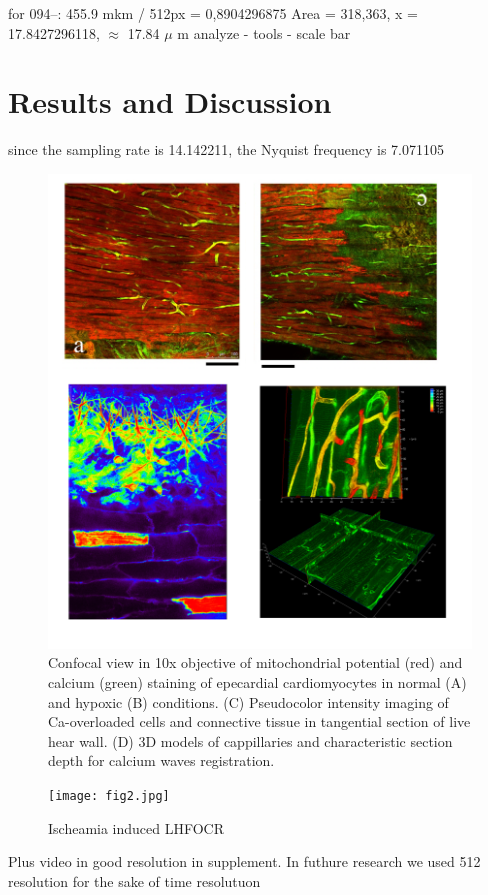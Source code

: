 \documentclass{biophys-new}
\begin{document}
for 094--: 455.9 mkm / 512px = 0,8904296875
Area = 318,363, x = 17.8427296118, $\approx$ 17.84 $\mu$ m
analyze - tools - scale bar


\section*{Results and Discussion}

since the sampling rate is 14.142211, the Nyquist frequency is 7.071105



\begin{figure}[hbt!]
\centering
\includegraphics[width=0.8\linewidth]{fig1.png}
\caption{Confocal view in 10x objective of mitochondrial potential (red) and calcium (green) staining of epecardial cardiomyocytes in normal (A) and hypoxic (B) conditions. (C) Pseudocolor intensity imaging of Ca-overloaded cells and connective tissue in  tangential section of live hear wall. (D) 3D models of  cappillaries and characteristic section depth for calcium waves registration.}
\label{fig:fig1}
\end{figure}


\begin{figure}
    \texttt{[image: fig2.jpg]}
    \caption{Ischeamia induced LHFOCR}
    \label{fig:fig2}
\end{figure}

Plus video in good resolution in supplement. In futhure research we used 512 resolution for the sake of time resolutuon
\end{document}
